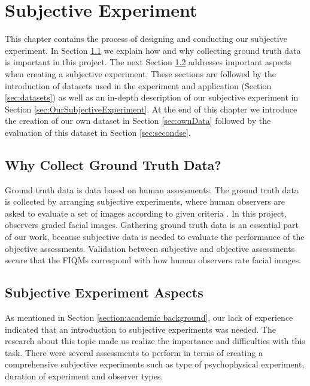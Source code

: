 \chapter{Subjective Experiment}


\label{chap:subjective}
This chapter contains the process of designing and conducting our subjective experiment. In Section \ref{sec:groundTruth} we explain how and why collecting ground truth data is important in this project. The next Section \ref{sec:SubjectiveAspects} addresses important aspects when creating a subjective experiment. These sections are followed by the introduction of datasets used in the experiment and application (Section \ref{sec:datasets}) as well as an in-depth description of our subjective experiment in Section \ref{sec:OurSubjectiveExperiment}. At the end of this chapter we introduce the creation of our own dataset in Section \ref{sec:ownData} followed by the evaluation of this dataset in Section \ref{sec:secondse}.

\section{Why Collect Ground Truth Data?}
\label{sec:groundTruth}
Ground truth data is data based on human assessments. The ground truth data is collected by arranging subjective experiments, where human observers are asked to evaluate a set of images according to given criteria \cite{Xphdthesis}. In this project, observers graded facial images. Gathering ground truth data is an essential part of our work, because subjective data is needed to evaluate the performance of the objective assessments. Validation between subjective and objective assessments secure that the FIQMs correspond with how human observers rate facial images. 

\section{Subjective Experiment Aspects}
\label{sec:SubjectiveAspects}
As mentioned in Section \ref{section:academic background}, our lack of experience indicated that an introduction to subjective experiments was needed. The research about this topic made us realize the importance and difficulties with this task. There were several assessments to perform in terms of creating a comprehensive subjective experiments such as type of psychophysical experiment, duration of experiment and observer types.


